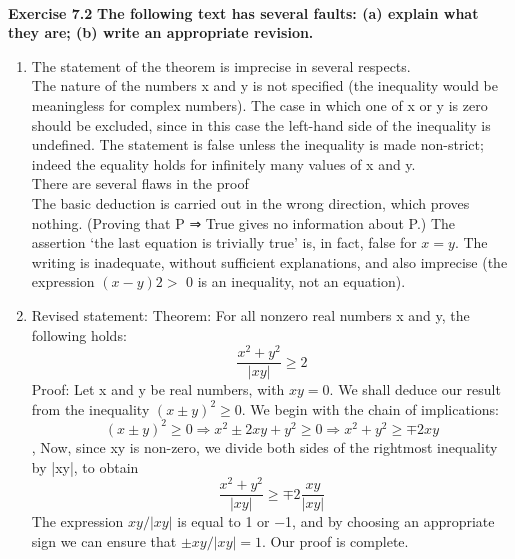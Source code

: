 \documentclass{article}
\begin{document}
	\text{}\\
	\textbf{\large\color{blue} Exercise 7.2} \textbf{The following text has several faults: (a) explain what they are; (b)
    write an appropriate revision.}\\
    \begin{enumerate}[label=(\alph*)]
    \item  
    The statement of the theorem is imprecise in several respects.\\
    The nature of the numbers x and y is not specified (the inequality would be meaningless for complex numbers).
    The case in which one of x or y is zero should be excluded, since in this case the
    left-hand side of the inequality is undefined.
    The statement is false unless the inequality is made non-strict; indeed the equality
    holds for infinitely many values of x and y.\\
    There are several flaws in the proof\\
    The basic deduction is carried out in the wrong direction, which proves nothing.
    (Proving that P ⇒ True gives no information about P.)
    The assertion ‘the last equation is trivially true’ is, in fact, false for $x = y$.
    The writing is inadequate, without sufficient explanations, and also imprecise (the
    expression $(x − y)2 >$ 0 is an inequality, not an equation).
    \item
    Revised statement:
    Theorem: For all nonzero real numbers x and y, the following holds:\\
    \[ \frac{ x^{2}+y^{2} }{|xy|} \geq 2 \]
    Proof: Let x and y be real numbers, with $xy = 0$. We shall deduce our result from
    the inequality $(x ± y)^{2} \geq 0$. We begin with the chain of implications:
    \[ (x ± y)^{2} \geq 0 ⇒ x^{2} ± 2xy + y^{2} \geq 0 ⇒ x^{2} + y^{2} \geq ∓ 2xy\],
    Now, since xy is non-zero, we divide both sides of the rightmost inequality by |xy|,
    to obtain
    \[ \frac{ x^{2}+y^{2} }{|xy|} \geq  ∓ 2\frac{xy}{|xy|}\]
    The expression $xy/|xy|$ is equal to 1 or −1, and by choosing an appropriate sign we
can ensure that $±xy/|xy| = 1$. Our proof is complete.
\end{enumerate}
    
\end{document}
